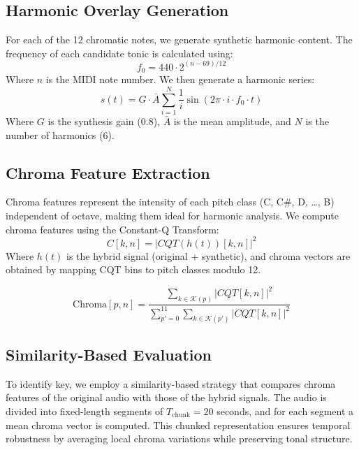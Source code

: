 \documentclass[10pt,twocolumn]{article}
\begin{document}
\subsection{Harmonic Overlay Generation}\label{subsec:harmonic-overlay-generation}
For each of the 12 chromatic notes, we generate synthetic harmonic content.
The frequency of each candidate tonic is calculated using:
\begin{equation}
f_0 = 440 \cdot 2^{(n-69)/12}\label{eq:equation3}
\end{equation}
Where $n$ is the MIDI note number. We then generate a harmonic series:
\begin{equation}
s(t) = G \cdot \bar{A} \sum_{i=1}^{N} \frac{1}{i} \sin(2\pi \cdot i \cdot f_0 \cdot t)\label{eq:equation4}
\end{equation}
Where $G$ is the synthesis gain (0.8), $\bar{A}$ is the mean amplitude, and $N$ is the number of harmonics (6).


\subsection{Chroma Feature Extraction}\label{subsec:chroma-feature-extraction}
Chroma features represent the intensity of each pitch class (C, C\#, D, \ldots, B) independent of octave, making them ideal for harmonic analysis. We compute chroma features using the Constant-Q Transform:
\begin{equation}
C[k,n] = |CQT(h(t))[k,n]|^2\label{eq:equation2}
\end{equation}
Where $h(t)$ is the hybrid signal (original + synthetic), and chroma vectors are obtained by mapping CQT bins to pitch classes modulo 12.

\begin{equation}
\mathrm{Chroma}[p,n] =
\frac{\sum_{k \in \mathcal{K}(p)} \left| CQT[k,n] \right|^2}
{\sum_{p'=0}^{11} \sum_{k \in \mathcal{K}(p')} \left| CQT[k,n] \right|^2} \label{eq:chroma_cqt_norm}
\end{equation}

\subsection{Similarity-Based Evaluation}\label{subsec:similarity-based-evaluation}

To identify key, we employ a similarity-based strategy that compares chroma features of the original audio with those of the hybrid signals.
The audio is divided into fixed-length segments of $T_{\text{chunk}} = 20$ seconds, and for each segment a mean chroma vector is computed.
This chunked representation ensures temporal robustness by averaging local chroma variations while preserving tonal structure.
\end{document}
